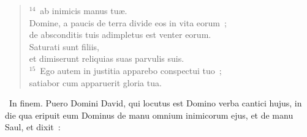\begin{flushleft}
\begin{verse}
${}^{14}$~ab inimicis manus tu\ae .\\ Domine, a paucis de terra divide eos in vita eorum~;\\ de absconditis tuis adimpletus est venter eorum.\\ Saturati sunt filiis,\\ et dimiserunt reliquias suas parvulis suis.\\
${}^{15}$~Ego autem in justitia apparebo conspectui tuo~;\\ satiabor cum apparuerit gloria tua.\end{verse}\end{flushleft}


~\lettrine[lines=10,image=true,loversize=0.05,lraise=-0.03]{I}{}n finem. Puero Domini David, qui locutus est Domino verba cantici hujus, in die qua eripuit eum Dominus de manu omnium inimicorum ejus, et de manu Saul, et dixit~:
